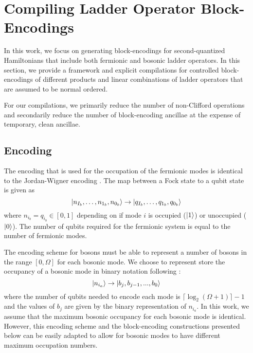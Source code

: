 \section{Compiling Ladder Operator Block-Encodings}
\label{sec:ladder-op-oracles}

In this work, we focus on generating block-encodings for second-quantized Hamiltonians that include both fermionic and bosonic ladder operators.
In this section, we provide a framework and explicit compilations for controlled block-encodings of different products and linear combinations of ladder operators that are assumed to be normal ordered.

For our compilations, we primarily reduce the number of non-Clifford operations and secondarily reduce the number of block-encoding ancillae at the expense of temporary, clean ancillae.

\subsection{Encoding}
\label{subsec:encoding}

The encoding that is used for the occupation of the fermionic modes is identical to the Jordan-Wigner encoding \cite{jordan-wigner}.
The map between a Fock state to a qubit state is given as 
\begin{equation}
    \ket{n_{I_b}, \dots, n_{1_b}, n_{0_b}} \rightarrow \ket{q_{I_b}, \dots, q_{1_b}, q_{0_b}}
\end{equation}
where $n_{i_b} = q_{i_b} \in [0, 1]$ depending on if mode $i$ is occupied ($\ket{1}$) or unoccupied ($\ket{0}$).
The number of qubits required for the fermionic system is equal to the number of fermionic modes.

The encoding scheme for bosons must be able to represent a number of bosons in the range $[0, \Omega]$ for each bosonic mode.
We choose to represent store the occupancy of a bosonic mode in binary notation following \cite{rhodes2024exponential}:
\begin{equation}
    \ket{n_{i_a}} \rightarrow \ket{b_j, b_{j-1}, ..., b_0}
\end{equation}
where the number of qubits needed to encode each mode is $\lceil \log_2{(\Omega + 1)} \rceil - 1$ and the values of $b_j$ are given by the binary representation of $n_{i_a}$.
In this work, we assume that the maximum bosonic occupancy for each bosonic mode is identical.
However, this encoding scheme and the block-encoding constructions presented below can be easily adapted to allow for bosonic modes to have different maximum occupation numbers.

